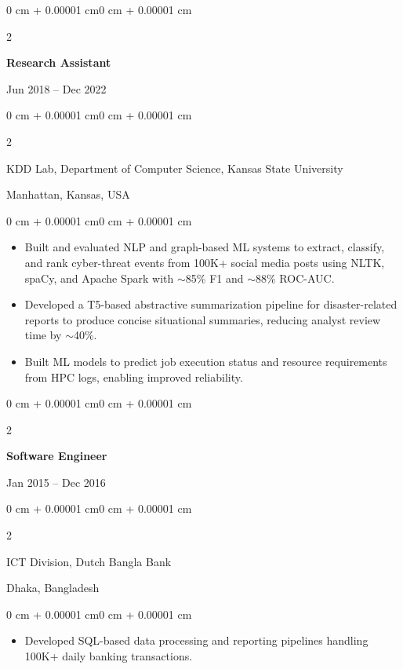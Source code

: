 \documentclass[10pt, letterpaper]{article}
\newenvironment{highlights}{
    \begin{itemize}[topsep=0.10 cm, parsep=0.10 cm, partopsep=0pt, itemsep=0pt, leftmargin=0 cm + 10pt]
}{\end{itemize}}
\newenvironment{onecolentry}{
    \begin{adjustwidth}{0 cm + 0.00001 cm}{0 cm + 0.00001 cm}
}{\end{adjustwidth}}
\newenvironment{twocolentry}[2][]{
    \onecolentry
    \def\secondColumn{#2}
    \setcolumnwidth{\fill, 4.5 cm}
    \begin{paracol}{2}
}{
    \switchcolumn \raggedleft \secondColumn
    \end{paracol}
    \endonecolentry
}
\begin{document}
    \vspace{1mm}

    \begin{twocolentry}{Jun 2018 -- Dec 2022}
        \textbf{Research Assistant}
    \end{twocolentry}
    \begin{twocolentry}{Manhattan, Kansas, USA}
       KDD Lab, Department of Computer Science, Kansas State University
    \end{twocolentry}
    \vspace{0.10 cm}
    \begin{onecolentry}
        \begin{highlights}
            \item Built and evaluated NLP and graph-based ML systems to extract, classify, and rank cyber-threat events from 100K+ social media posts using NLTK, spaCy, and Apache Spark with $\sim$85\% F1 and $\sim$88\% ROC-AUC.
            \item Developed a T5-based abstractive summarization pipeline for disaster-related reports to produce concise situational summaries, reducing analyst review time by $\sim$40\%.
            \item Built ML models to predict job execution status and resource requirements from HPC logs, enabling improved reliability.
        \end{highlights}
    \end{onecolentry}

    \vspace{0.1 cm}
    \begin{twocolentry}{Jan 2015 -- Dec 2016}
        \textbf{Software Engineer}
    \end{twocolentry}
    \begin{twocolentry}{Dhaka, Bangladesh}
       ICT Division, Dutch Bangla Bank
    \end{twocolentry}

    \begin{onecolentry}
        \begin{highlights}
            \item Developed SQL-based data processing and reporting pipelines handling 100K+ daily banking transactions.
        \end{highlights}
    \end{onecolentry}

\vspace{-1mm}
\end{document}
